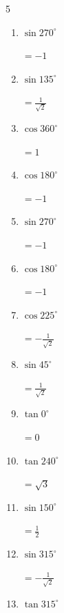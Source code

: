\begin{multicols}{5}
\begin{enumerate}
        $\displaystyle =-\frac{\sqrt{3}}{2}$

  \item $\displaystyle \sin{270^\circ}$

        $\displaystyle =-1$

  \item $\displaystyle \sin{135^\circ}$

        $\displaystyle =\frac{1}{\sqrt{2}}$

  \item $\displaystyle \cos{360^\circ}$

        $\displaystyle =1$

  \item $\displaystyle \cos{180^\circ}$

        $\displaystyle =-1$

\columnbreak %

  \item $\displaystyle \sin{270^\circ}$

        $\displaystyle =-1$

  \item $\displaystyle \cos{180^\circ}$

        $\displaystyle =-1$

  \item $\displaystyle \cos{225^\circ}$

        $\displaystyle =-\frac{1}{\sqrt{2}}$

  \item $\displaystyle \sin{45^\circ}$

        $\displaystyle =\frac{1}{\sqrt{2}}$

  \item $\displaystyle \tan{0^\circ}$

        $\displaystyle =0$

  \item $\displaystyle \tan{240^\circ}$

        $\displaystyle =\sqrt{3}$

  \item $\displaystyle \sin{150^\circ}$

        $\displaystyle =\frac{1}{2}$

  \item $\displaystyle \sin{315^\circ}$

        $\displaystyle =-\frac{1}{\sqrt{2}}$

  \item $\displaystyle \tan{315^\circ}$


\end{enumerate}
\end{multicols}
